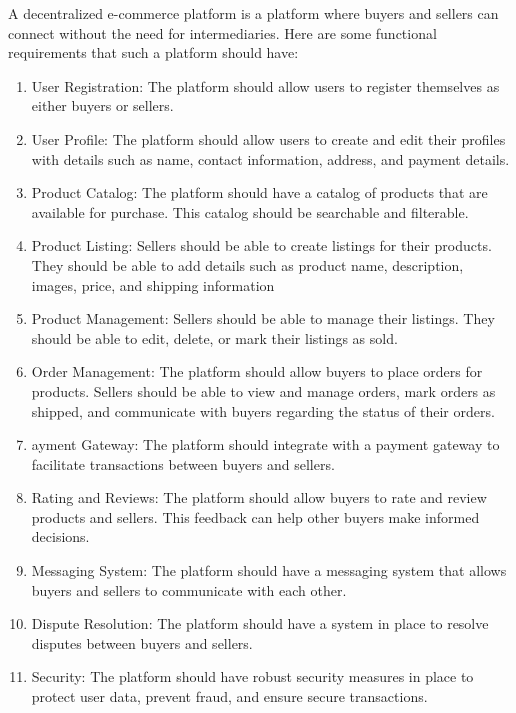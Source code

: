 \documentclass[a4paper,11pt]{article}
\begin{document}
\begin{center}
 A decentralized e-commerce platform is a platform where buyers and sellers can connect without the need for intermediaries. Here are some functional requirements that such a platform should have:

\begin{enumerate}
        \item User Registration: The platform should allow users to register themselves as either buyers or sellers. \\
    
    \item User Profile: The platform should allow users to create and edit their profiles with details such as name, contact information, address, and payment details. \\

    \item  Product Catalog: The platform should have a catalog of products that are available for purchase. This catalog should be searchable and filterable.

\item Product Listing: Sellers should be able to create listings for their products. They should be able to add details such as product name, description, images, price, and shipping information
\item Product Management: Sellers should be able to manage their listings. They should be able to edit, delete, or mark their listings as sold.
\item Order Management: The platform should allow buyers to place orders for products. Sellers should be able to view and manage orders, mark orders as shipped, and communicate with buyers regarding the status of their orders.
\item ayment Gateway: The platform should integrate with a payment gateway to facilitate transactions between buyers and sellers.
\item Rating and Reviews: The platform should allow buyers to rate and review products and sellers. This feedback can help other buyers make informed decisions.
\item Messaging System: The platform should have a messaging system that allows buyers and sellers to communicate with each other.
\item Dispute Resolution: The platform should have a system in place to resolve disputes between buyers and sellers.
\item Security: The platform should have robust security measures in place to protect user data, prevent fraud, and ensure secure transactions.


\end{enumerate}
\end{center}
\end{document}
